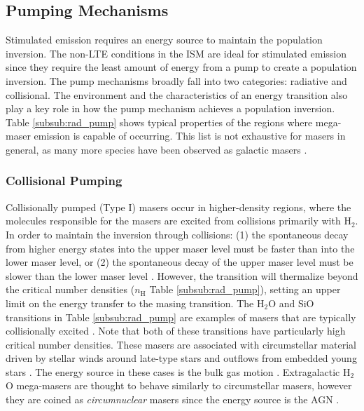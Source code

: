\subsection{Pumping Mechanisms}
\label{sub:pumping}

Stimulated emission requires an energy source to maintain the population inversion.  The non-LTE conditions in the ISM are ideal for stimulated emission since they require the least amount of energy from a pump to create a population inversion.  The pump mechanisms broadly fall into two categories: radiative and collisional.  The environment and the characteristics of an energy transition also play a key role in how the pump mechanism achieves a population inversion.  Table \ref{subsub:rad_pump} shows typical properties of the regions where mega-maser emission is capable of occurring.  This list is not exhaustive for masers in general, as many more species have been observed as galactic masers \citep[][e.g., ]{Elitzur_1992_review}. 

\subsubsection{Collisional Pumping}
\label{subsub:coll_pump}

Collisionally pumped (Type I) masers occur in higher-density regions, where the molecules responsible for the masers are excited from collisions primarily with H$_2$. In order to maintain the inversion through collisions: (1) the spontaneous decay from higher energy states into the upper maser level must be faster than into the lower maser level, or (2) the spontaneous decay of the upper maser level must be slower than the lower maser level \citep{Goldreich_1974}. However, the transition will thermalize beyond the critical number densities ($n_{\mathrm{H}}$ Table \ref{subsub:rad_pump}), setting an upper limit on the energy transfer to the masing transition.  The H$_2$O and SiO transitions in Table \ref{subsub:rad_pump} are examples of masers that are typically collisionally excited \citep{Elitzur_1992}. Note that both of these transitions have particularly high critical number densities. These masers are associated with circumstellar material driven by stellar winds around late-type stars and outflows from embedded young stars \citep{Elitzur_1992}. The energy source in these cases is the bulk gas motion \citep{stahler_palla_2004}. Extragalactic H$_2$O mega-masers are thought to behave similarly to circumstellar masers, however they are coined as {\it circumnuclear} masers since the energy source is the AGN \citep[see \S\ref{sub:h2o_props}][e.g.,]{lo2005}. 

